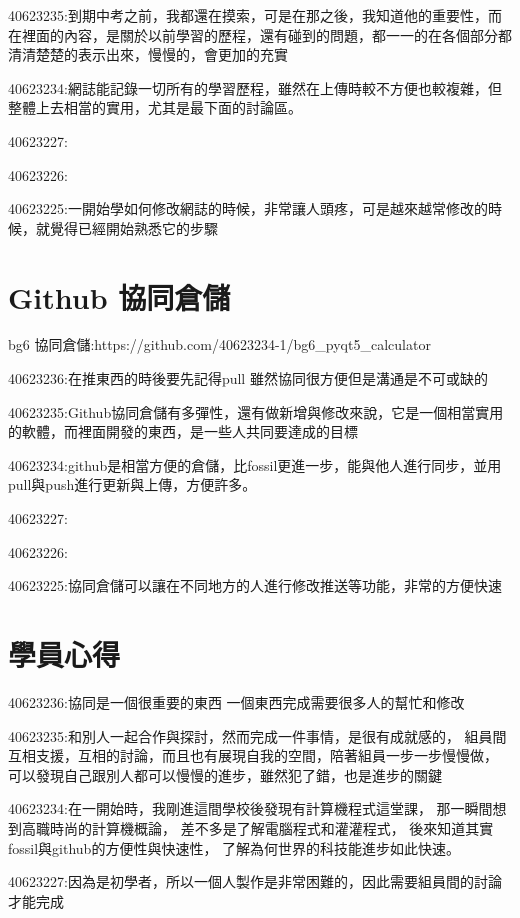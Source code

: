 \documentclass[12pt,,]{report}
\begin{document}
40623235:到期中考之前，我都還在摸索，可是在那之後，我知道他的重要性，而在裡面的內容，是關於以前學習的歷程，還有碰到的問題，都一一的在各個部分都清清楚楚的表示出來，慢慢的，會更加的充實

40623234:網誌能記錄一切所有的學習歷程，雖然在上傳時較不方便也較複雜，但整體上去相當的實用，尤其是最下面的討論區。

40623227:

40623226:

40623225:一開始學如何修改網誌的時候，非常讓人頭疼，可是越來越常修改的時候，就覺得已經開始熟悉它的步驟

\hypertarget{github-ux5354ux540cux5009ux5132}{%
\section{Github 協同倉儲}\label{github-ux5354ux540cux5009ux5132}}

bg6 協同倉儲:https://github.com/40623234-1/bg6\_pyqt5\_calculator

40623236:在推東西的時後要先記得pull 雖然協同很方便但是溝通是不可或缺的

40623235:Github協同倉儲有多彈性，還有做新增與修改來說，它是一個相當實用的軟體，而裡面開發的東西，是一些人共同要達成的目標

40623234:github是相當方便的倉儲，比fossil更進一步，能與他人進行同步，並用pull與push進行更新與上傳，方便許多。

40623227:

40623226:

40623225:協同倉儲可以讓在不同地方的人進行修改推送等功能，非常的方便快速

\hypertarget{ux5b78ux54e1ux5fc3ux5f97}{%
\section{學員心得}\label{ux5b78ux54e1ux5fc3ux5f97}}

40623236:協同是一個很重要的東西 一個東西完成需要很多人的幫忙和修改

40623235:和別人一起合作與探討，然而完成一件事情，是很有成就感的，
組員間互相支援，互相的討論，而且也有展現自我的空間，陪著組員一步一步慢慢做，
可以發現自己跟別人都可以慢慢的進步，雖然犯了錯，也是進步的關鍵

40623234:在一開始時，我剛進這間學校後發現有計算機程式這堂課，
那一瞬間想到高職時尚的計算機概論， 差不多是了解電腦程式和灌灌程式，
後來知道其實fossil與github的方便性與快速性，
了解為何世界的科技能進步如此快速。

40623227:因為是初學者，所以一個人製作是非常困難的，因此需要組員間的討論才能完成
\end{document}
